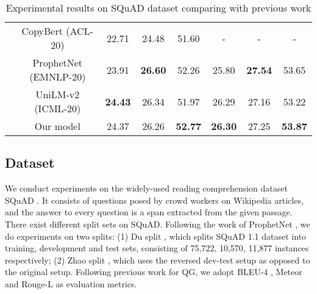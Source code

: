 \documentclass[11pt]{article}
\begin{document}
\begin{table*}[t]
\begin{tabular}{@{}c|c|ccc|ccc@{}}
& CopyBert (ACL-20)                    & 22.71          & 24.48          & 51.60   & -                    & -                    & -                    \\

& ProphetNet (EMNLP-20)                  & 23.91          & \textbf{26.60} & 52.26   & 25.80                & \textbf{27.54}       & 53.65       \\
                                          
                                          & UniLM-v2 (ICML-20)                    & \textbf{24.43} & 26.34          & 51.97   & 26.29       & 27.16                & 53.22                \\
                                          \cmidrule(l){2-8} 
                                          & Our model                    & 24.37 & 26.26          & \textbf{52.77}   & \textbf{26.30}       & 27.25                & \textbf{53.87}       \\ \bottomrule[1pt]
\end{tabular}
\caption{Experimental results on SQuAD dataset comparing with previous work}
\label{main-results-table}
\end{table*}

\subsection{Dataset}
We conduct experiments on the widely-used reading comprehension dataset SQuAD \citep{rajpurkar-etal-2016-squad}. It consists of questions posed by crowd workers on Wikipedia articles, and the answer to every question is a span extracted from the given passage. There exist different split sets on SQuAD. Following the work of ProphetNet \citep{qi-etal-2020-prophetnet}, we do experiments on two splits: (1) Du split \cite{du-etal-2017-learning}, which splits SQuAD 1.1 dataset into training, development and test sets, consisting of 75,722, 10,570, 11,877 instances respectively; (2) Zhao split \citep{zhao-etal-2018-paragraph}, which uses the reversed dev-test setup as opposed to the original setup.
Following previous work for QG, we adopt BLEU-4 \citep{papineni-etal-2002-bleu}, Meteor \citep{denkowski-lavie-2014-meteor} and Rouge-L \citep{lin-2004-rouge} as evaluation metrics.
\end{document}
